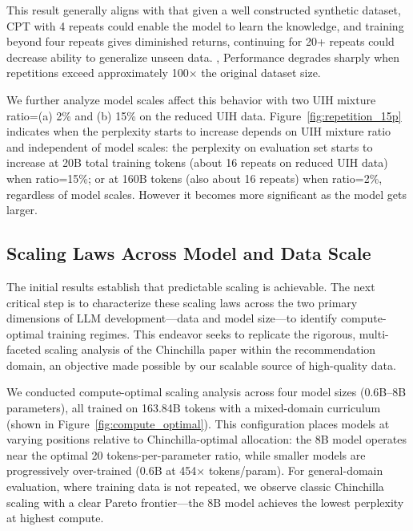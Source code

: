 \documentclass[]{fairmeta}
\begin{document}
This result generally aligns with \cite{yang2024syntheticcontinuedpretraining} that given a well constructed synthetic dataset, CPT with 4 repeats could enable the model to learn the knowledge, and \cite{muennighoffScalingDataConstrainedLanguage2025} training beyond four repeats gives diminished returns, continuing for 20+ repeats could \cite{hronTrainingLanguageModels2024} decrease ability to generalize unseen data. \cite{allenzhu2024physicslanguagemodels33, yang2024syntheticcontinuedpretraining}, Performance degrades sharply when repetitions exceed approximately 100$\times$ the original dataset size. 

We further analyze model scales affect this behavior with two UIH mixture ratio=(a) 2\% and (b) 15\% on the reduced UIH data. Figure~\ref{fig:repetition_15p} indicates when the perplexity starts to increase depends on UIH mixture ratio and independent of model scales: the perplexity on evaluation set starts to increase at 20B total training tokens (about 16 repeats on reduced UIH data) when ratio=15\%; or at 160B tokens (also about 16 repeats) when ratio=2\%, regardless of model scales. However it becomes more significant as the model gets larger.

\subsection{Scaling Laws Across Model and Data Scale}
The initial results establish that predictable scaling is achievable. The next critical step is to characterize these scaling laws across the two primary dimensions of LLM development—data and model size—to identify compute-optimal training regimes. This endeavor seeks to replicate the rigorous, multi-faceted scaling analysis of the Chinchilla paper within the recommendation domain, an objective made possible by our scalable source of high-quality data.

We conducted compute-optimal scaling analysis across four model sizes (0.6B–8B parameters), all trained on 163.84B tokens with a mixed-domain curriculum (shown in Figure~\ref{fig:compute_optimal}). This configuration places models at varying positions relative to Chinchilla-optimal allocation: the 8B model operates near the optimal 20 tokens-per-parameter ratio, while smaller models are progressively over-trained (0.6B at 454× tokens/param). For general-domain evaluation, where training data is not repeated, we observe classic Chinchilla scaling with a clear Pareto frontier—the 8B model achieves the lowest perplexity at highest compute. 
\end{document}
